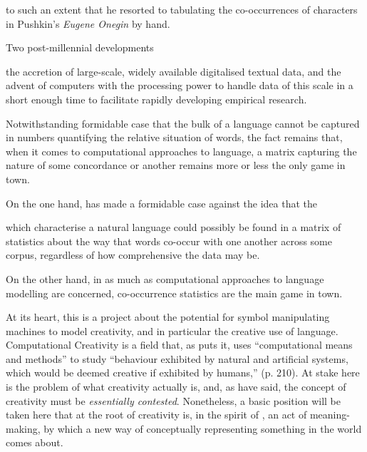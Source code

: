 to such an extent that he resorted to tabulating the co-occurrences of characters in Pushkin's \emph{Eugene Onegin} by hand.

Two post-millennial developments 

the accretion of large-scale, widely available digitalised textual data, and the advent of computers with the processing power to handle data of this scale in a short enough time to facilitate rapidly developing empirical research.

Notwithstanding  formidable case that the bulk of a language cannot be captured in numbers quantifying the relative situation of words, the fact remains that, when it comes to computational approaches to language, a matrix capturing the nature of some concordance or another remains more or less the only game in town.

On the one hand, \cite{Chomsky} has made a formidable case against the idea that the

which characterise a natural language could possibly be found in a matrix of statistics about the way that words co-occur with one another across some corpus, regardless of how comprehensive the data may be.

On the other hand, in as much as computational approaches to language modelling are concerned, co-occurrence statistics are the main game in town.


At its heart, this is a project about the potential for symbol manipulating machines to model creativity, and in particular the creative use of language.  Computational Creativity is a field that, as \cite{Wiggins2006b} puts it, uses ``computational means and methods'' to study ``behaviour exhibited by natural and artificial systems, which would be deemed creative if exhibited by humans,'' (p. 210).  At stake here is the problem of what creativity actually is, and, as \cite{Colton} have said, the concept of creativity must be \emph{essentially contested}.  Nonetheless, a basic position will be taken here that at the root of creativity is, in the spirit of \cite{Wittgenstein1953}, an act of meaning-making, by which a new way of conceptually representing something in the world comes about.

